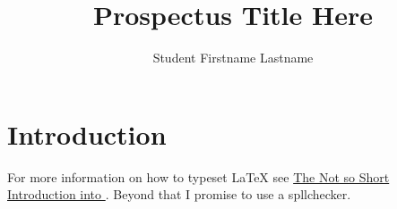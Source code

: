 \documentclass[letterpaper,12pt]{article}
\title{Prospectus Title Here}
\author{Student Firstname Lastname}
\begin{document}
\maketitle

\begin{abstract}
  \lipsum[1]
\end{abstract}

\section{Introduction}

For more information on how to typeset \LaTeX{} see 
\href{http://mirrors.ctan.org/info/lshort/english/lshort.pdf}
{The Not so Short Introduction into \LaTeXe}.
Beyond that I promise to use a spllchecker.

\lipsum[1-12]
\end{document}
